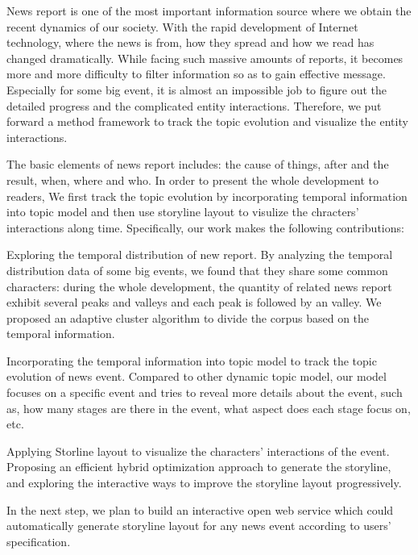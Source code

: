 \begin{eabstract}
  News report is one of the most important information source where 
  we obtain the recent dynamics of our society. With the rapid
  development of Internet technology, where the news is from, how
  they spread and how we read has changed dramatically. While facing
  such massive amounts of reports, it becomes more and more
  difficulty to filter information so as to gain effective message.
  Especially for some big event, it is almost an impossible job to
  figure out the detailed progress and the complicated entity
  interactions. Therefore, we put forward a method framework to 
  track the topic evolution and visualize the entity interactions.

  The basic elements of news report includes: the cause of things, after
  and the result, when, where and who. In order to present the whole
  development to readers, We first track the topic evolution
  by incorporating temporal information into topic model and then use
  storyline layout to visulize the chracters' interactions along time.
  Specifically, our work makes the following contributions:

  \begin{asparaenum}[(1)]
    \item Exploring the temporal distribution of new report. By
    analyzing the temporal distribution data of some big events, we
    found that they share some common characters: during the 
    whole development, the quantity of related news report exhibit
    several peaks and valleys and each peak is followed by an valley.
    We proposed an adaptive cluster algorithm to divide the corpus
    based on the temporal information.
    \item Incorporating the temporal information into topic model to
    track the topic evolution of news event. Compared to other dynamic
    topic model, our model focuses on a specific event and tries to 
    reveal more details about the event, such as, how many stages are
    there in the event, what aspect does each stage focus on, etc. 
    \item Applying Storline layout to visualize the characters'
    interactions of the event. Proposing an efficient hybrid
    optimization approach to generate the storyline, and exploring
    the interactive ways to improve the storyline layout progressively. 
  \end{asparaenum}

  In the next step, we plan to build an interactive open web service
  which could automatically generate storyline layout for any news
  event according to users' specification.

\end{eabstract}

